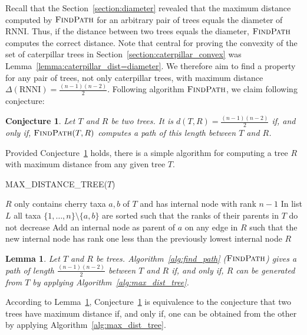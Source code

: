 \documentclass{amsart}
\newcommand{\rnni}{\mathrm{RNNI}}
\newcommand{\findpath}{\textsc{FindPath}}
\newtheorem{conjecture}[definition]{Conjecture}
\newtheorem{lemma}[definition]{Lemma}
\begin{document}
Recall that the Section~\ref{section:diameter} revealed that the maximum distance computed by $\findpath$ for an arbitrary pair of trees equals the diameter of $\rnni$.
Thus, if the distance between two trees equals the diameter, $\findpath$ computes the correct distance.
Note that central for proving the convexity of the set of caterpillar trees in Section~\ref{section:caterpillar_convex} was Lemma~\ref{lemma:caterpillar_dist=diameter}.
We therefore aim to find a property for any pair of trees, not only caterpillar trees, with maximum distance $\Delta(\rnni) = \frac{(n-1)(n-2)}{2}$.
Following algorithm $\findpath$, we claim following conjecture:

\begin{conjecture}
    Let $T$ and $R$ be two trees.
    It is $d(T,R) = \frac{(n-1)(n-2)}{2}$ if, and only if, $\findpath(T,R)$ computes a path of this length between $T$ and $R$.
    \label{conjecture:findpath_maxdist_correct}
\end{conjecture}

Provided Conjecture~\ref{conjecture:findpath_maxdist_correct} holds, there is a simple algorithm for computing a tree $R$ with maximum distance from any given tree $T$.

\begin{algorithm}[H]
\caption{MAX\_DISTANCE\_TREE($T$)}
\label{alg:max_dist_tree}
\begin{algorithmic}[1]
	\STATE $R$ only contains cherry taxa $a, b$ of $T$ and has internal node with rank $n-1$
    \STATE In list $L$ all taxa $\{1,\ldots,n\}\setminus\{a,b\}$ are sorted such that the ranks of their parents in $T$ do not decrease
		\STATE Add an internal node as parent of $a$ on any edge in $R$ such that the new internal node has rank one less than the previously lowest internal node
	\ENDFOR
	\RETURN $R$
\end{algorithmic}
\end{algorithm}

\begin{lemma}
    Let $T$ and $R$ be trees.
    Algorithm~\ref{alg:find_path} ($\findpath$) gives a path of length $\frac{(n-1)(n-2)}{2}$ between $T$ and $R$ if, and only if, $R$ can be generated from $T$ by applying Algorithm~\ref{alg:max_dist_tree}.
    \label{lemma:max_dist_lemmas_equivalence}
\end{lemma}

According to Lemma~\ref{lemma:max_dist_lemmas_equivalence}, Conjecture~\ref{conjecture:findpath_maxdist_correct} is equivalence to the conjecture that two trees have maximum distance if, and only if, one can be obtained from the other by applying Algorithm~\ref{alg:max_dist_tree}.
\end{document}
